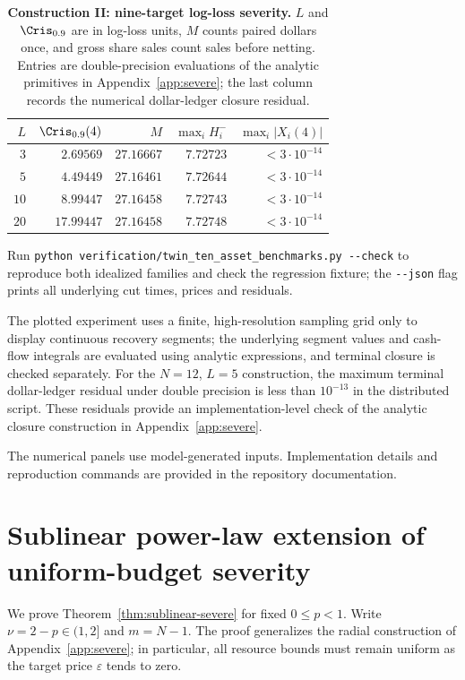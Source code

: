 \documentclass[review,hidelinks,onefignum,onetabnum]{siamonline250211}
\begin{document}
\begin{table}[H]\centering\small
\caption{\textbf{Construction II: nine-target log-loss
severity.} $L$ and $\Cris_{0.9}$ are in log-loss units,
$M$ counts paired dollars once, and gross share sales
count sales before netting. Entries are double-precision
evaluations of the analytic primitives in Appendix~\ref{app:severe};
the last column records the numerical dollar-ledger closure residual.}
\label{tab:twin-severe}
\begin{tabular}{@{}rrrrr@{}}\toprule
$L$ & $\Cris_{0.9}(4)$ & $M$ &
$\max_i H_i^-$ & $\max_i|X_i(4)|$\\\midrule
$3$ & $2.69569$ & $27.16667$ & $7.72723$ & $<3\cdot10^{-14}$\\
$5$ & $4.49449$ & $27.16461$ & $7.72644$ & $<3\cdot10^{-14}$\\
$10$ & $8.99447$ & $27.16458$ & $7.72743$ & $<3\cdot10^{-14}$\\
$20$ & $17.99447$ & $27.16458$ & $7.72748$ & $<3\cdot10^{-14}$\\
\bottomrule\end{tabular}
\end{table}

Run \texttt{python verification/twin\_ten\_asset\_benchmarks.py -{}-check}
to reproduce both idealized families and check the
regression fixture; the \texttt{-{}-json} flag prints
all underlying cut times, prices and residuals.

The plotted experiment uses a finite, high-resolution sampling grid only to display continuous recovery segments; the underlying segment values and cash-flow integrals are evaluated using analytic expressions, and terminal closure is checked separately. For the $N=12$, $L=5$ construction, the maximum terminal dollar-ledger residual under double precision is less than $10^{-13}$ in the distributed script. These residuals provide an implementation-level check of the analytic closure construction in Appendix~\ref{app:severe}.

The numerical panels use model-generated inputs. Implementation details and reproduction commands are provided in the repository documentation.




\section{Sublinear power-law extension of uniform-budget severity}\label{app:sublinear-severe}
We prove Theorem~\ref{thm:sublinear-severe} for fixed $0\le p<1$.
Write $\nu=2-p\in(1,2]$ and $m=N-1$. The proof generalizes
the radial construction of Appendix~\ref{app:severe}; in
particular, all resource bounds must remain uniform as the
target price $\varepsilon$ tends to zero.
\end{document}
